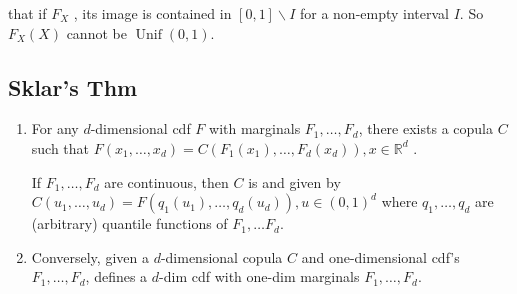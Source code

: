  that if $F_{X}$ , its image is contained in $[0,1] \backslash I$ for a non-empty interval $I$. So $F_{X}(X)$ cannot be $\operatorname{Unif}(0,1)$.




\subsection*{Sklar’s Thm}
\begin{enumerate}[label = (\arabic*), leftmargin=*]
    \item For any $d$-dimensional cdf $F$ with marginals $F_{1}, \ldots, F_{d}$, there exists a copula $C$ such that
$
F\left(x_{1}, \ldots, x_{d}\right)=C\left(F_{1}\left(x_{1}\right), \ldots, F_{d}\left(x_{d}\right)\right), x \in \mathbb{R}^{d}
$ \red{(*)}.

If $F_{1}, \ldots, F_{d}$ are continuous, then $C$ is  and given by
$
C\left(u_{1}, \ldots, u_{d}\right)=F\left(q_{1}\left(u_{1}\right), \ldots, q_{d}\left(u_{d}\right)\right), u \in(0,1)^{d}
$ where $q_{1}, \ldots, q_{d}$ are (arbitrary) quantile functions of $F_{1}, \ldots F_{d}$.
    \item Conversely, given a $d$-dimensional copula $C$ and one-dimensional cdf's $F_{1}, \ldots, F_{d}$, \red{(*)} defines a $d$-dim cdf with one-dim marginals $F_{1}, \ldots, F_{d}$.
\end{enumerate}



